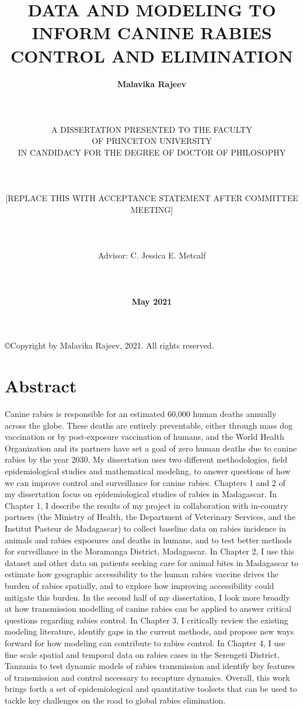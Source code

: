 \documentclass[
  oneside]{book}
\title{\textbf{DATA AND MODELING TO INFORM CANINE RABIES CONTROL AND ELIMINATION}\\}
\author{}
\date{\vspace{-2.5em}\textbf{Malavika Rajeev}\\
~\\
~\\
~\\
A DISSERTATION PRESENTED TO THE FACULTY\\
OF PRINCETON UNIVERSITY\\
IN CANDIDACY FOR THE DEGREE OF DOCTOR OF PHILOSOPHY\\
~\\
~\\
~\\
{[}REPLACE THIS WITH ACCEPTANCE STATEMENT AFTER COMMITTEE MEETING{]}\\
~\\
~\\
~\\
Advisor: C. Jessica E. Metcalf\\
~\\
~\\
~\\
\textbf{May 2021}}
\begin{document}
\maketitle


\begin{center}

\copyright  Copyright by Malavika Rajeev, 2021. All rights reserved.

\end{center}

\frontmatter

\setcounter{page}{3}  %

\section*{Abstract}

Canine rabies is responsible for an estimated 60,000 human deaths annually across the globe. These deaths are entirely preventable, either through mass dog vaccination or by post-exposure vaccination of humans, and the World Health Organization and its partners have set a goal of zero human deaths due to canine rabies by the year 2030. My dissertation uses two different methodologies, field epidemiological studies and mathematical modeling, to answer questions of how we can improve control and surveillance for canine rabies. Chapters 1 and 2 of my dissertation focus on epidemiological studies of rabies in Madagascar. In Chapter 1, I describe the results of my project in collaboration with in-country partners (the Ministry of Health, the Department of Veterinary Services, and the Institut Pasteur de Madagascar) to collect baseline data on rabies incidence in animals and rabies exposures and deaths in humans, and to test better methods for surveillance in the Moramanga District, Madagascar. In Chapter 2, I use this dataset and other data on patients seeking care for animal bites in Madagascar to estimate how geographic accessibility to the human rabies vaccine drives the burden of rabies spatially, and to explore how improving accessibility could mitigate this burden. In the second half of my dissertation, I look more broadly at how transmission modelling of canine rabies can be applied to answer critical questions regarding rabies control. In Chapter 3, I critically review the existing modeling literature, identify gaps in the current methods, and propose new ways forward for how modeling can contribute to rabies control. In Chapter 4, I use fine scale spatial and temporal data on rabies cases in the Serengeti District, Tanzania to test dynamic models of rabies transmission and identify key features of transmission and control necessary to recapture dynamics. Overall, this work brings forth a set of epidemiological and quantitative toolsets that can be used to tackle key challenges on the road to global rabies elimination. 
\end{document}
